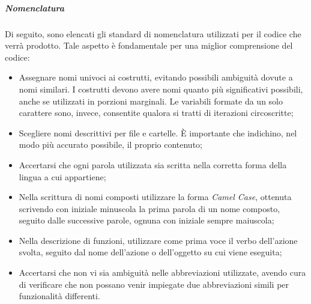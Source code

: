 			\subparagraph{Nomenclatura}
			Di seguito, sono elencati gli standard di nomenclatura utilizzati per il codice che verrà prodotto. Tale aspetto è fondamentale per una miglior comprensione del codice:
			\begin{itemize}
			\item Assegnare nomi univoci ai costrutti, evitando possibili ambiguità dovute a nomi similari. I costrutti devono avere nomi quanto più significativi possibili, anche se utilizzati in porzioni marginali. Le variabili formate da un solo carattere sono, invece, consentite qualora si tratti di iterazioni circoscritte;
			\item Scegliere nomi descrittivi per file e cartelle. \MakeUppercase{è} importante che indichino, nel modo più accurato possibile, il proprio contenuto;
			\item Accertarsi che ogni parola utilizzata sia scritta nella corretta forma della lingua a cui appartiene;
			\item Nella scrittura di nomi composti utilizzare la forma \textit{Camel Case}, ottenuta scrivendo con iniziale minuscola la prima parola di un nome composto, seguito dalle successive parole, ognuna con iniziale sempre maiuscola;
			\item Nella descrizione di funzioni, utilizzare come prima voce il verbo dell'azione svolta, seguito dal nome dell'azione o dell'oggetto su cui viene eseguita;
			\item Accertarsi che non vi sia ambiguità nelle abbreviazioni utilizzate, avendo cura di verificare che non possano venir impiegate due abbreviazioni simili per funzionalità differenti.
			\end{itemize}
					
